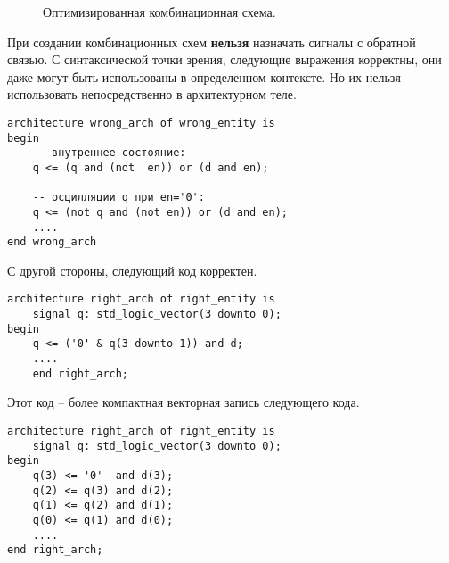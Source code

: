\begin{figure}[ht]
\centering
{}
\caption{Оптимизированная комбинационная схема.}
\label{comb_circuit_opt}
\end{figure}

При создании комбинационных схем \textbf{нельзя} назначать сигналы с обратной связью. С синтаксической точки зрения, следующие выражения корректны, они даже могут быть использованы в определенном контексте. Но их нельзя использовать непосредственно в архитектурном теле.

\begin{lstlisting}
architecture wrong_arch of wrong_entity is
begin
    -- внутреннее состояние:
    q <= (q and (not  en)) or (d and en);

    -- осцилляции q при en='0':
    q <= (not q and (not en)) or (d and en);
    ....
end wrong_arch
\end{lstlisting}

С другой стороны, следующий код корректен.

\begin{lstlisting}
architecture right_arch of right_entity is
    signal q: std_logic_vector(3 downto 0);
begin
    q <= ('0' & q(3 downto 1)) and d;
    ....
    end right_arch;
\end{lstlisting}

Этот код – более компактная векторная запись следующего кода.

\begin{lstlisting}
architecture right_arch of right_entity is
    signal q: std_logic_vector(3 downto 0);
begin
    q(3) <= '0'  and d(3);
    q(2) <= q(3) and d(2);
    q(1) <= q(2) and d(1);
    q(0) <= q(1) and d(0);
    ....
end right_arch;
\end{lstlisting}

